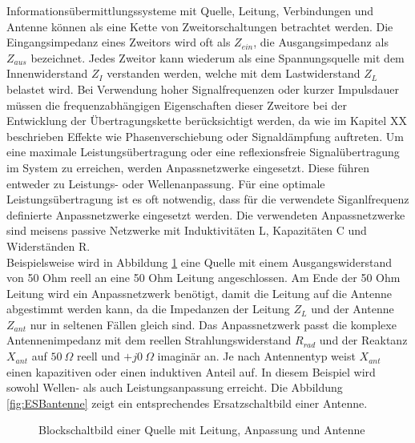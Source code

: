 Informationsübermittlungssysteme mit Quelle, Leitung, Verbindungen und Antenne können als eine Kette von Zweitorschaltungen betrachtet werden. Die Eingangsimpedanz eines Zweitors wird oft als $Z_{ein}$, die Ausgangsimpedanz als $Z_{aus}$ bezeichnet. 
Jedes Zweitor kann wiederum als eine Spannungsquelle mit dem Innenwiderstand $Z_I$ verstanden werden, welche mit dem Lastwiderstand $Z_L$ belastet wird. Bei Verwendung hoher Signalfrequenzen oder kurzer Impulsdauer müssen die frequenzabhängigen Eigenschaften dieser Zweitore bei der Entwicklung der Übertragungskette berücksichtigt werden, da wie im Kapitel XX beschrieben Effekte wie Phasenverschiebung oder Signaldämpfung auftreten. Um eine maximale Leistungsübertragung oder eine reflexionsfreie Signalübertragung im System zu erreichen, werden Anpassnetzwerke eingesetzt. Diese führen entweder zu Leistungs- oder Wellenanpassung. Für eine optimale Leistungsübertragung ist es oft notwendig, dass für die verwendete Siganlfrequenz definierte Anpassnetzwerke eingesetzt werden. Die verwendeten Anpassnetzwerke sind meisens passive Netzwerke mit Induktivitäten L, Kapazitäten C und Widerständen R.\\

Beispielsweise wird in Abbildung \ref{fig:Anpassung} eine Quelle mit einem Ausgangswiderstand von 50 Ohm reell an eine 50 Ohm Leitung angeschlossen. Am Ende der 50 Ohm Leitung wird ein Anpassnetzwerk benötigt, damit die Leitung auf die Antenne abgestimmt werden kann, da die Impedanzen der Leitung $Z_L$ und der Antenne $Z_{ant}$ nur in seltenen Fällen gleich sind. Das Anpassnetzwerk passt die komplexe Antennenimpedanz mit dem reellen Strahlungswiderstand $R_{rad}$ und der Reaktanz $X_{ant}$ auf $50\ \Omega$ reell und $+j0\ \Omega$ imaginär an. Je nach Antennentyp weist $X_{ant}$ einen kapazitiven oder einen induktiven Anteil auf. In diesem Beispiel wird sowohl Wellen- als auch Leistungsanpassung erreicht. Die Abbildung \ref{fig:ESBantenne} zeigt ein entsprechendes Ersatzschaltbild einer Antenne.\\


\begin{figure}[!ht]
	\begin{center}
	\end{center}
\caption{Blockschaltbild einer Quelle mit Leitung, Anpassung und Antenne}
\label{fig:Anpassung}
\end{figure}

